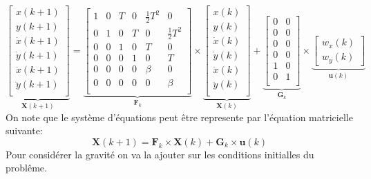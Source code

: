 \documentclass{article}
\begin{document}
\begin{equation}
    \underbrace{\begin{bmatrix}
        x(k+1)\\
        y(k+1)\\
        \dot{x}(k+1)\\
        \dot{y}(k+1)\\
        \ddot{x}(k+1)\\
        \ddot{y}(k+1)\\
    \end{bmatrix}}_{\mathbf{X}(k+1)}
    = 
    \underbrace{\begin{bmatrix}
        1 & 0 & T & 0 & \frac{1}{2}T^2 & 0\\
        0 & 1 & 0 & T & 0              & \frac{1}{2}T^2\\
        0 & 0 & 1 & 0 & T              & 0 \\
        0 & 0 & 0 & 1 & 0              & T \\
        0 & 0 & 0 & 0 & \beta          & 0 \\
        0 & 0 & 0 & 0 & 0              & \beta \\
    \end{bmatrix}}_{\mathbf{F}_{k}}
    \times
    \underbrace{\begin{bmatrix}
        x(k)\\
        y(k)\\
        \dot{x}(k)\\
        \dot{y}(k)\\
        \ddot{x}(k)\\
        \ddot{y}(k)\\
    \end{bmatrix}}_{\mathbf{X}(k)}
    + 
    \underbrace{\begin{bmatrix}
        0 & 0 \\
        0 & 0 \\
        0 & 0 \\
        0 & 0 \\
        1 & 0 \\
        0 & 1 \\
    \end{bmatrix}}_{\mathbf{G}_{k}}
    \times
    \underbrace{\begin{bmatrix}
        w_{x}(k)\\
        w_{y}(k)
    \end{bmatrix}}_{\mathbf{u}(k)}
\end{equation}
On note que le système d'équations peut être represente par l'équation matricielle suivante:
\begin{equation}
    \boxed{\mathbf{X}(k+1) = \mathbf{F}_{k} \times \mathbf{X}(k) + \mathbf{G}_{k} \times \mathbf{u}(k)}
\end{equation}
Pour considérer la gravité on va la ajouter sur les conditions initialles du problême.
\end{document}
